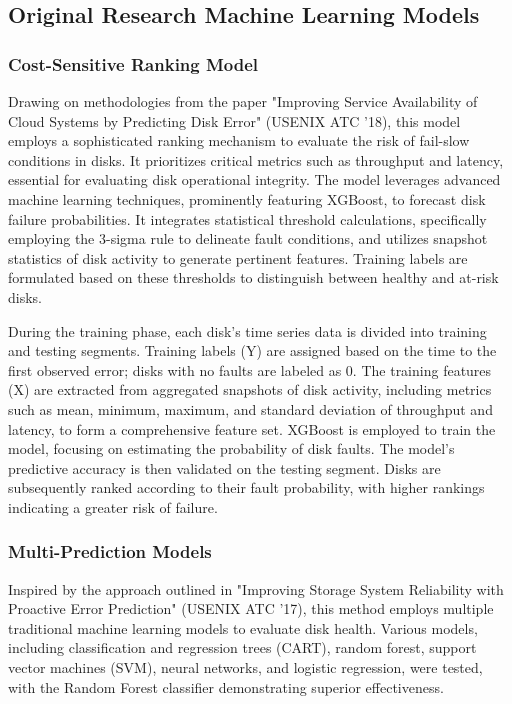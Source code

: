 \documentclass{article}
\begin{document}
\subsection{Original Research Machine Learning Models}

\subsubsection{Cost-Sensitive Ranking Model}

\quad Drawing on methodologies from the paper "Improving Service Availability of Cloud Systems by Predicting Disk Error" (USENIX ATC '18), this model employs a sophisticated ranking mechanism to evaluate the risk of fail-slow conditions in disks. It prioritizes critical metrics such as throughput and latency, essential for evaluating disk operational integrity. The model leverages advanced machine learning techniques, prominently featuring XGBoost, to forecast disk failure probabilities. It integrates statistical threshold calculations, specifically employing the 3-sigma rule to delineate fault conditions, and utilizes snapshot statistics of disk activity to generate pertinent features. Training labels are formulated based on these thresholds to distinguish between healthy and at-risk disks.

\quad During the training phase, each disk's time series data is divided into training and testing segments. Training labels (Y) are assigned based on the time to the first observed error; disks with no faults are labeled as 0. The training features (X) are extracted from aggregated snapshots of disk activity, including metrics such as mean, minimum, maximum, and standard deviation of throughput and latency, to form a comprehensive feature set. XGBoost is employed to train the model, focusing on estimating the probability of disk faults. The model's predictive accuracy is then validated on the testing segment. Disks are subsequently ranked according to their fault probability, with higher rankings indicating a greater risk of failure.

\subsubsection{Multi-Prediction Models}

\quad Inspired by the approach outlined in "Improving Storage System Reliability with Proactive Error Prediction" (USENIX ATC '17), this method employs multiple traditional machine learning models to evaluate disk health. Various models, including classification and regression trees (CART), random forest, support vector machines (SVM), neural networks, and logistic regression, were tested, with the Random Forest classifier demonstrating superior effectiveness.
\end{document}
